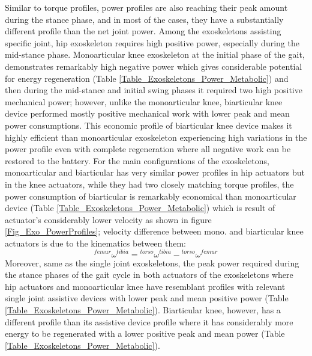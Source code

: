 \documentclass[10pt,letterpaper]{article}
\begin{document}
Similar to torque profiles, power profiles are also reaching their peak amount during the stance phase, and in most of the cases, they have a substantially different profile than the net joint power. Among the exoskeletons assisting specific joint, hip exoskeleton requires high positive power, especially during the mid-stance phase. Monoarticular knee exoskeleton at the initial phase of the gait, demonstrates remarkably high negative power which gives considerable potential for energy regeneration (Table \ref{Table_Exoskeletons_Power_Metabolic}) and then during the mid-stance and initial swing phases it required two high positive mechanical power; however, unlike the monoarticular knee, biarticular knee device performed mostly positive mechanical work with lower peak and mean power consumptions. This economic profile of biarticular knee device makes it highly efficient than monoarticular exoskeleton experiencing high variations in the power profile even with complete regeneration where all negative work can be restored to the battery.
For the main configurations of the exoskeletons, monoarticular and biarticular has very similar power profiles in hip actuators but in the knee actuators, while they had two closely matching torque profiles, the power consumption of biarticular is remarkably economical than monoarticular device (Table \ref{Table_Exoskeletons_Power_Metabolic}) which is result of actuator's considerably lower velocity as shown in figure \ref{Fig_Exo_PowerProfiles}; velocity difference between mono. and biarticular knee actuators is due to the kinematics between them:
\begin{equation}
	{}^{femur}\omega^{tibia} = {}^{torso}\omega^{tibia} - {}^{torso}\omega^{femur} 
\end{equation}
Moreover, same as the single joint exoskeletons, the peak power required during the stance phases of the gait cycle in both actuators of the exoskeletons where hip actuators and monoarticular knee have resemblant profiles with relevant single joint assistive devices with lower peak and mean positive power (Table \ref{Table_Exoskeletons_Power_Metabolic}). Biarticular knee, however, has a different profile than its assistive device profile where it has considerably more energy to be regenerated with a lower positive peak and mean power (Table \ref{Table_Exoskeletons_Power_Metabolic}).
\end{document}
